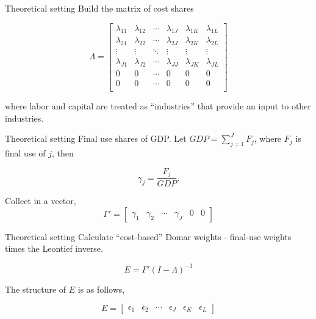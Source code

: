 \documentclass[10pt, xcolor=dvipsnames]{beamer}
\begin{document}
\begin{frame}{Theoretical setting}
Build the matrix of cost shares

\begin{equation}
  \Lambda = 
  \begin{bmatrix}
    \lambda_{11} & \lambda_{12} & \cdots & \lambda_{1J} & \lambda_{1K} & \lambda_{1L} \\
    \lambda_{21} & \lambda_{22} & \cdots & \lambda_{2J} & \lambda_{2K} & \lambda_{2L} \\
    \vdots       & \vdots       & \ddots & \vdots       & \vdots       & \vdots  \\
    \lambda_{J1} & \lambda_{J2} & \cdots & \lambda_{JJ} & \lambda_{JK} & \lambda_{JL} \\
    0 & 0 & \cdots & 0 & 0& 0 \\
    0 & 0 & \cdots & 0 & 0& 0 \\
  \end{bmatrix}
\end{equation}

where labor and capital are treated as ``industries'' that provide an input to other industries.

\end{frame}


\begin{frame}{Theoretical setting}
Final use shares of GDP. Let $GDP = \sum_{j=1}^J F_j$, where $F_j$ is final use of $j$, then

\begin{equation}
  \gamma_j = \frac{F_j}{GDP}.
\end{equation}

Collect in a vector,
\begin{equation}
  \Gamma' = 
  \begin{bmatrix}
    \gamma_1 &
    \gamma_2 &
    \cdots &
    \gamma_J &
    0 &
    0
  \end{bmatrix}
\end{equation}

\end{frame}

\begin{frame}{Theoretical setting}
Calculate ``cost-based'' Domar weights - final-use weights times the Leontief inverse. 

\begin{equation}
  E = \Gamma' (I - \Lambda)^{-1} \label{EQ_E}
\end{equation}

The structure of $E$ is as follows,

\begin{equation}
  E = 
  \begin{bmatrix}
    \epsilon_1 &
    \epsilon_2 &
    \cdots &
    \epsilon_J &
    \epsilon_K &
    \epsilon_L
  \end{bmatrix}
\end{equation}

\end{frame}
\end{document}
